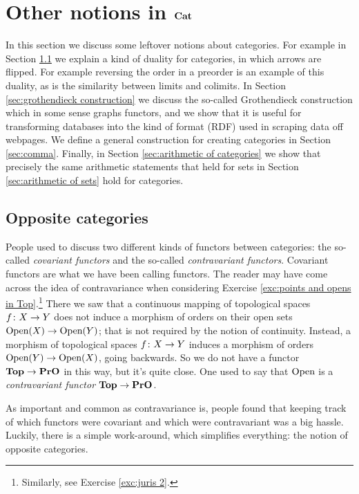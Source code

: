 

\section{Other notions in ${\bf Cat}$}

In this section we discuss some leftover notions about categories. For example in Section \ref{sec:opposite} we explain a kind of duality for categories, in which arrows are flipped. For example reversing the order in a preorder is an example of this duality, as is the similarity between limits and colimits. In Section \ref{sec:grothendieck construction} we discuss the so-called Grothendieck construction which in some sense graphs functors, and we show that it is useful for transforming databases into the kind of format (RDF) used in scraping data off webpages. We define a general construction for creating categories in Section \ref{sec:comma}. Finally, in Section \ref{sec:arithmetic of categories} we show that precisely the same arithmetic statements that held for sets in Section \ref{sec:arithmetic of sets} hold for categories. 


\subsection{Opposite categories}\label{sec:opposite}

People used to discuss two different kinds of functors between categories: the so-called {\em covariant functors} and the so-called {\em contravariant functors}. Covariant functors are what we have been calling functors. The reader may have come across the idea of contravariance when considering Exercise \ref{exc:points and opens in Top}.\footnote{Similarly, see Exercise \ref{exc:juris 2}.} There we saw that a continuous mapping of topological spaces $f\colon X\rightarrow Y$ does not induce a morphism of orders on their open sets $\textnormal{Open}(X)\rightarrow\textnormal{Open}(Y)$; that is not required by the notion of continuity. Instead, a morphism of topological spaces $f\colon X\rightarrow Y$ induces a morphism of orders $\textnormal{Open}(Y)\rightarrow\textnormal{Open}(X)$, going backwards. So we do not have a functor ${\bf Top}\rightarrow{\bf PrO}$ in this way, but it's quite close. One used to say that $\textnormal{Open}$ is a {\em contravariant functor} ${\bf Top}\rightarrow{\bf PrO}$.

As important and common as contravariance is, people found that keeping track of which functors were covariant and which were contravariant was a big hassle. Luckily, there is a simple work-around, which simplifies everything: the notion of opposite categories.

